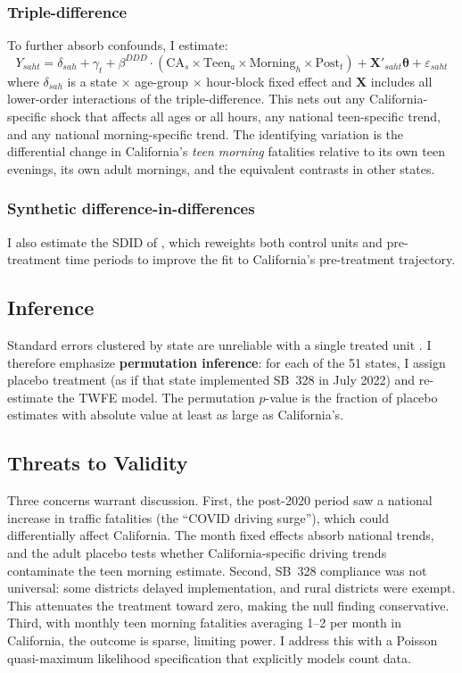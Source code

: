 \documentclass[12pt]{article}
\begin{document}
\subsubsection*{Triple-difference} To further absorb confounds, I estimate:
\begin{equation}
Y_{saht} = \delta_{sah} + \gamma_t + \beta^{DDD} \cdot (\text{CA}_s \times \text{Teen}_a \times \text{Morning}_h \times \text{Post}_t) + \mathbf{X}'_{saht}\boldsymbol{\theta} + \varepsilon_{saht}
\label{eq:ddd}
\end{equation}
where $\delta_{sah}$ is a state $\times$ age-group $\times$ hour-block fixed effect and $\mathbf{X}$ includes all lower-order interactions of the triple-difference. This nets out any California-specific shock that affects all ages or all hours, any national teen-specific trend, and any national morning-specific trend. The identifying variation is the differential change in California's \emph{teen morning} fatalities relative to its own teen evenings, its own adult mornings, and the equivalent contrasts in other states.

\subsubsection*{Synthetic difference-in-differences} I also estimate the SDID of \citet{arkhangelsky2021synthetic}, which reweights both control units and pre-treatment time periods to improve the fit to California's pre-treatment trajectory.

\subsection{Inference}

Standard errors clustered by state are unreliable with a single treated unit \citep{conley2011inference}. I therefore emphasize \textbf{permutation inference}: for each of the 51 states, I assign placebo treatment (as if that state implemented SB~328 in July 2022) and re-estimate the TWFE model. The permutation $p$-value is the fraction of placebo estimates with absolute value at least as large as California's.

\subsection{Threats to Validity}

Three concerns warrant discussion. First, the post-2020 period saw a national increase in traffic fatalities (the ``COVID driving surge''), which could differentially affect California. The month fixed effects absorb national trends, and the adult placebo tests whether California-specific driving trends contaminate the teen morning estimate. Second, SB~328 compliance was not universal: some districts delayed implementation, and rural districts were exempt. This attenuates the treatment toward zero, making the null finding conservative. Third, with monthly teen morning fatalities averaging 1--2 per month in California, the outcome is sparse, limiting power. I address this with a Poisson quasi-maximum likelihood specification that explicitly models count data.
\end{document}
